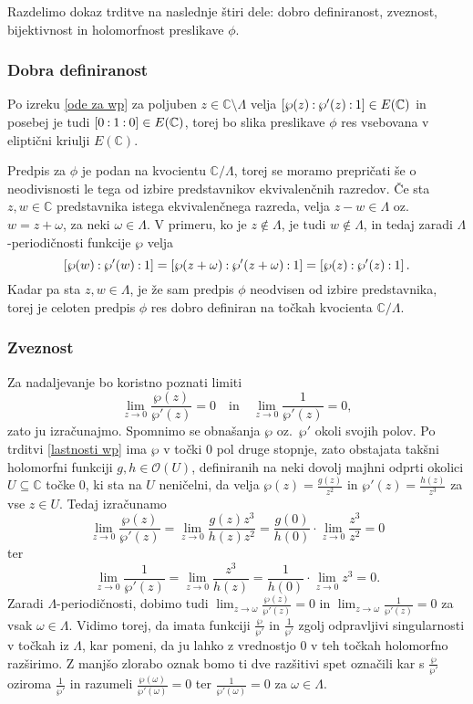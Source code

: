 \documentclass[mat1]{fmfdelo}
\numberwithin{equation}{section}
\newcommand{\C}{\mathbb C}
\newcommand{\oio}{\pcoor{0: 1 : 0}}
\newcommand{\om}{\omega}
\newcommand{\torus}{\C/\Lambda}
\newcommand{\pcoor}[1]{%
\begingroup\lccode`~=`: \lowercase{\endgroup
\edef~}{\mathbin{\mathchar\the\mathcode`:}\nobreak}%
\left[%
\begingroup
\mathcode`:=\string"8000
#1%
\endgroup
\right]%
}
\newcommand{\hol}[1]{\mathcal{O}(#1)}
\newcommand{\oz}{oz.\ }
\theoremstyle{definition}
\begin{document}
\begin{dokaz}
    Razdelimo dokaz trditve na naslednje štiri dele: dobro definiranost, zveznost, bijektivnost in holomorfnost preslikave $\phi$.
    \subsubsection*{Dobra definiranost}
    Po izreku \ref{ode za wp} za poljuben $z \in \C\setminus\Lambda$ velja $\pcoor{\wp(z) : \wp'(z) : 1} \in E(\C)$ in posebej je tudi $\oio \in E(\C)$, torej bo slika preslikave $\phi$ res vsebovana v eliptični kriulji $E(\C)$. 
    
    Predpis za $\phi$ je podan na kvocientu $\torus$, torej se moramo prepričati še o neodivisnosti le tega od izbire predstavnikov ekvivalenčnih razredov. Če sta $z,w \in \C$ predstavnika istega ekvivalenčnega razreda, velja $z - w \in \Lambda$ \oz $w = z + \om$, za neki $\om \in \Lambda$. V primeru, ko je $z \not\in \Lambda$, je tudi $w \not\in \Lambda$, in tedaj zaradi $\Lambda$-periodičnosti funkcije $\wp$ velja
    \[
        \pcoor{\wp(w) : \wp'(w) : 1} = 
        \pcoor{\wp(z + \om) : \wp'(z  + \om) : 1} =
        \pcoor{\wp(z) : \wp'(z) : 1}. 
    \]
    Kadar pa sta $z, w \in \Lambda$, je že sam predpis $\phi$ neodvisen od izbire predstavnika, torej je celoten predpis $\phi$ res dobro definiran na točkah kvocienta $\torus$. 

    \subsubsection*{Zveznost}
    Za nadaljevanje bo koristno poznati limiti
    \[
        \lim_{z \to 0} \frac{\wp(z)}{\wp'(z)} = 0 \quad \text{in} \quad 
        \lim_{z \to 0} \frac{1}{\wp'(z)} = 0,
    \] 
    zato ju izračunajmo. Spomnimo se obnašanja $\wp$ \oz $\wp'$ okoli svojih polov. Po trditvi \ref{lastnosti wp} ima $\wp$ v točki $0$ pol druge stopnje, zato obstajata takšni holomorfni funkciji $g,h \in \hol{U}$, definiranih na neki dovolj majhni odprti okolici $U\subseteq\C$ točke $0$, ki sta na $U$ neničelni, da velja $\wp(z) = \frac{g(z)}{z^2}$ in $\wp'(z) = \frac{h(z)}{z^3}$ za vse $z \in U$. Tedaj izračunamo
    \[
        \lim_{z \to 0} \frac{\wp(z)}{\wp'(z)} = \lim_{z \to 0} \frac{g(z)z^3}{h(z)z^2} = 
        \frac{g(0)}{h(0)} \cdot \lim_{z \to 0}\frac{z^3}{z^2} = 0
    \]
    ter
    \[
        \lim_{z \to 0} \frac{1}{\wp'(z)} = \lim_{z \to 0} \frac{z^3}{h(z)} = 
        \frac{1}{h(0)} \cdot \lim_{z \to 0}z^3 = 0.
    \]
    Zaradi $\Lambda$-periodičnosti, dobimo tudi $\lim_{z \to \om} \frac{\wp(z)}{\wp'(z)} = 0$ in $\lim_{z \to \om} \frac{1}{\wp'(z)} = 0$ za vsak $\om \in \Lambda$. Vidimo torej, da imata funkciji $\frac{\wp}{\wp'}$ in $\frac{1}{\wp'}$ zgolj odpravljivi singularnosti v točkah iz $\Lambda$, kar pomeni, da ju lahko z vrednostjo $0$ v teh točkah holomorfno razširimo. Z manjšo zlorabo oznak bomo ti dve razšitivi spet označili kar s $\frac{\wp}{\wp'}$ oziroma $\frac{1}{\wp'}$ in razumeli $\frac{\wp(\om)}{\wp'(\om)} = 0$ ter $\frac{1}{\wp'(\om)} = 0$ za $\om \in \Lambda$.


\end{dokaz}
\end{document}
